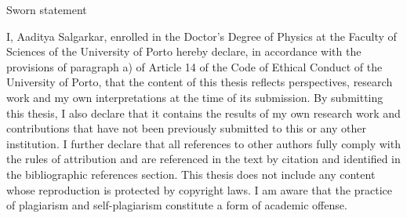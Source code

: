 \documentclass[11pt, twoside,hidelinks]{Thesis}
\author[mailto:salgarkaraaditya@fc.up.pt]{Aaditya \textsc{Salgarkar}} %
\begin{document}
\frontmatter %



\begin{frontchapter}{Sworn statement} \label{sworn_statement}

  I, Aaditya Salgarkar, enrolled in the Doctor’s Degree of Physics at the Faculty of Sciences of the
University of Porto hereby declare, in accordance with the provisions of paragraph a) of
Article 14 of the Code of Ethical Conduct of the University of Porto, that the content of
this thesis reflects perspectives, research work and my own interpretations at the time
of its submission.
By submitting this thesis, I also declare that it contains the results of my own research
work and contributions that have not been previously submitted to this or any other
institution.
I further declare that all references to other authors fully comply with the rules of
attribution and are referenced in the text by citation and identified in the bibliographic
references section. This thesis does not include any content whose reproduction is
protected by copyright laws.
I am aware that the practice of plagiarism and self-plagiarism constitute a form of
academic offense.
\end{frontchapter}
\cleardoublepage


\end{document}
